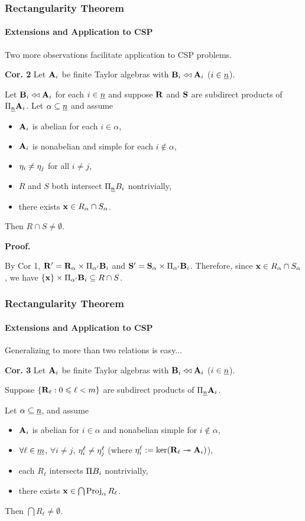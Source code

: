 \documentclass[xcolor=dvipsnames,9pt,hide notes,mathserif]{beamer}
\newcommand{\csp}{\acs{CSP}\xspace}
\begin{document}
\begin{frame} \frametitle{Rectangularity Theorem}
  \framesubtitle{Extensions and Application to CSP}

  Two more observations facilitate application to \csp problems. 

  \bigskip
  {\bf Cor. 2} Let $\mathbf{A}_i$ be finite Taylor algebras with
  $\mathbf{B}_i \mathrel{\triangleleft\triangleleft} \mathbf{A}_i$ ($i\in \underline{n}$).
  
  Let $\mathbf{B}_i \mathrel{\triangleleft\triangleleft} \mathbf{A}_i$ for each $i\in \underline{n}$ and suppose
  $\mathbf{R}$ and $\mathbf{S}$ are subdirect products of $\Pi_{\underline{n}} \mathbf{A}_i$.
  Let $\alpha \subseteq \underline{n}$ and assume
  \begin{itemize}
  \item $\mathbf{A}_i$ is abelian for each $i \in \alpha$,
  \item $\mathbf{A}_i$ is nonabelian and simple for each $i \notin \alpha$,
  \item $\eta_i \neq \eta_j$ for all $i\neq j$,
  \item $R$ and $S$ both intersect $\Pi_{\underline{n}} B_i$ nontrivially, 
  \item there exists $\mathbf{x} \in R_\alpha \cap S_\alpha$.
  \end{itemize}
  Then $R \cap S \neq \emptyset$.

  {\bf Proof.}
  
    By Cor 1, $\mathbf{R}'= \mathbf{R}_\alpha   \times \Pi_{\alpha'}\mathbf{B}_i$ and
    $\mathbf{S}'= \mathbf{S}_\alpha   \times \Pi_{\alpha'}\mathbf{B}_i$. 
    Therefore, since $\mathbf{x} \in R_\alpha \cap S_\alpha$, we have
    $\{\mathbf{x}\} \times \Pi_{\alpha'}\mathbf{B}_i \subseteq R \cap S$.

\end{frame}

\begin{frame} \frametitle{Rectangularity Theorem}
  \framesubtitle{Extensions and Application to CSP}

  Generalizing to more than two relations is easy...

  \bigskip
  {\bf Cor. 3} Let $\mathbf{A}_i$ be finite Taylor algebras with
  $\mathbf{B}_i \mathrel{\triangleleft\triangleleft} \mathbf{A}_i$ ($i\in \underline{n}$).
  
  Suppose $\{\mathbf{R}_\ell : 0\leqslant \ell < m\}$ are subdirect products of 
  $\Pi_{\underline{n}} \mathbf{A}_i$.

  Let $\alpha \subseteq \underline{n}$, and assume
      \begin{itemize}
      \item $\mathbf{A}_i$ is abelian for $i \in \alpha$ and nonabelian simple for $i \notin \alpha$,
      \item $\forall \ell \in \underline{m}$, $\forall i\neq j$, 
        $\eta^\ell_i \neq \eta^\ell_j$  {\small (where $\eta^\ell_i := \ker(\mathbf{R}_\ell \twoheadrightarrow \mathbf{A}_i)$)},
      \item each $R_\ell$ intersects $\Pi B_i$ nontrivially, 
      \item there exists $\mathbf{x} \in \bigcap \operatorname{Proj}_\alpha R_\ell$.
      \end{itemize}
      Then $\bigcap R_\ell \neq \emptyset$.

\end{frame}
\end{document}
